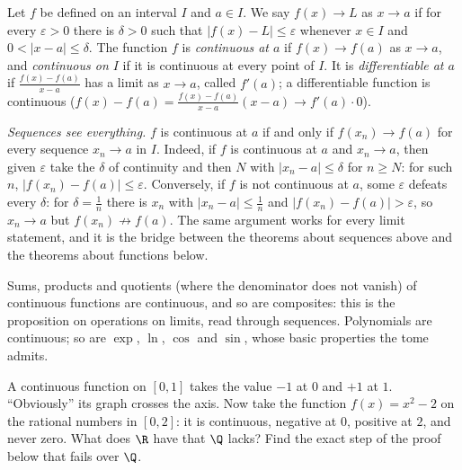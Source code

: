\begin{reminder}
Let $f$ be defined on an interval $I$ and $a\in I$. We say $f(x)\to L$ as $x\to a$ if for every $\varepsilon>0$ there is $\delta>0$ such that
$|f(x)-L|\le\varepsilon$ whenever $x\in I$ and $0<|x-a|\le\delta$. The function $f$ is \emph{continuous at $a$} if $f(x)\to f(a)$ as $x\to a$, and
\emph{continuous on $I$} if it is continuous at every point of $I$. It is \emph{differentiable at $a$} if $\frac{f(x)-f(a)}{x-a}$ has a limit as
$x\to a$, called $f'(a)$; a differentiable function is continuous ($f(x)-f(a)=\frac{f(x)-f(a)}{x-a}(x-a)\to f'(a)\cdot0$).

\emph{Sequences see everything.} $f$ is continuous at $a$ if and only if $f(x_n)\to f(a)$ for every sequence $x_n\to a$ in $I$. Indeed, if $f$ is continuous
at $a$ and $x_n\to a$, then given $\varepsilon$ take the $\delta$ of continuity and then $N$ with $|x_n-a|\le\delta$ for $n\ge N$: for such $n$,
$|f(x_n)-f(a)|\le\varepsilon$. Conversely, if $f$ is not continuous at $a$, some $\varepsilon$ defeats every $\delta$: for $\delta=\frac1n$ there is $x_n$
with $|x_n-a|\le\frac1n$ and $|f(x_n)-f(a)|>\varepsilon$, so $x_n\to a$ but $f(x_n)\not\to f(a)$. The same argument works for every limit statement, and
it is the bridge between the theorems about sequences above and the theorems about functions below.

Sums, products and quotients (where the denominator does not vanish) of continuous functions are continuous, and so are composites: this is the
proposition on operations on limits, read through sequences. Polynomials are continuous; so are $\exp$, $\ln$, $\cos$ and $\sin$, whose basic
properties the tome admits.
\end{reminder}

\begin{think}
A continuous function on $[0,1]$ takes the value $-1$ at $0$ and $+1$ at $1$. ``Obviously'' its graph crosses the axis. Now take the function
$f(x)=x^2-2$ on the rational numbers in $[0,2]$: it is continuous, negative at $0$, positive at $2$, and never zero. What does $\R$ have that $\Q$ lacks? Find the exact step of the proof below that fails over $\Q$.
\end{think}

